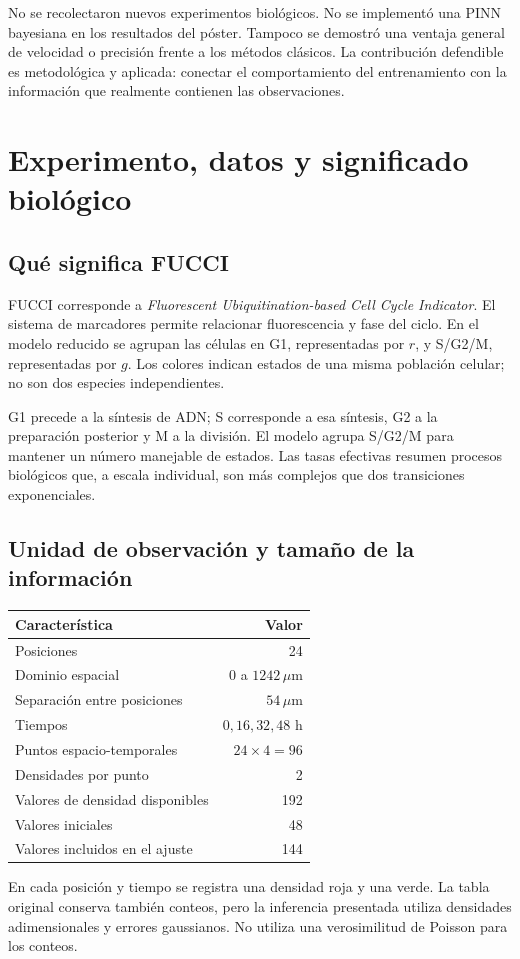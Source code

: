 \documentclass[11pt,a4paper]{report}
\begin{document}
No se recolectaron nuevos experimentos biológicos. No se implementó una PINN bayesiana en los resultados del póster. Tampoco se demostró una ventaja general de velocidad o precisión frente a los métodos clásicos. La contribución defendible es metodológica y aplicada: conectar el comportamiento del entrenamiento con la información que realmente contienen las observaciones.



\chapter{Experimento, datos y significado biológico}
\section{Qué significa FUCCI}
FUCCI corresponde a \emph{Fluorescent Ubiquitination-based Cell Cycle Indicator}. El sistema de marcadores permite relacionar fluorescencia y fase del ciclo. En el modelo reducido se agrupan las células en G1, representadas por $r$, y S/G2/M, representadas por $g$. Los colores indican estados de una misma población celular; no son dos especies independientes.

G1 precede a la síntesis de ADN; S corresponde a esa síntesis, G2 a la preparación posterior y M a la división. El modelo agrupa S/G2/M para mantener un número manejable de estados. Las tasas efectivas resumen procesos biológicos que, a escala individual, son más complejos que dos transiciones exponenciales.

\section{Unidad de observación y tamaño de la información}
\begin{center}
\begin{tabular}{lr}\toprule
Característica & Valor\\\midrule
Posiciones & 24\\
Dominio espacial & $0$ a $1242\,\mu\mathrm m$\\
Separación entre posiciones & $54\,\mu\mathrm m$\\
Tiempos & $0,16,32,48$ h\\
Puntos espacio-temporales & $24\times4=96$\\
Densidades por punto & 2\\
Valores de densidad disponibles & 192\\
Valores iniciales & 48\\
Valores incluidos en el ajuste & 144\\\bottomrule
\end{tabular}
\end{center}
En cada posición y tiempo se registra una densidad roja y una verde. La tabla original conserva también conteos, pero la inferencia presentada utiliza densidades adimensionales y errores gaussianos. No utiliza una verosimilitud de Poisson para los conteos.
\end{document}
